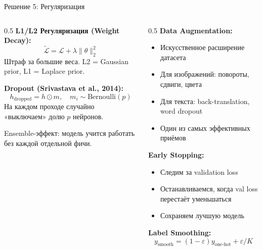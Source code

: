 \documentclass[aspectratio=169, 9pt]{beamer}
\begin{document}
\begin{frame}{Решение 5: Регуляризация}
  \begin{columns}[T]
    \begin{column}{0.5\textwidth}
      \textbf{L1/L2 Регуляризация (Weight Decay):}
      \[
      \tilde{\mathcal{L}} = \mathcal{L} + \lambda \|\theta\|_2^2
      \]
      Штраф за большие веса. L2 = Gaussian prior, L1 = Laplace prior.
      
      \vspace{0.5em}
      \textbf{Dropout (Srivastava et al., 2014):}
      \[
      h_{\text{dropped}} = h \odot m, \quad m_i \sim \text{Bernoulli}(p)
      \]
      На каждом проходе случайно «выключаем» долю $p$ нейронов.
      
      \vspace{0.3em}
      Ensemble-эффект: модель учится работать без каждой отдельной фичи.
    \end{column}
    \begin{column}{0.5\textwidth}
      \textbf{Data Augmentation:}
      \begin{itemize}
        \item Искусственное расширение датасета
        \item Для изображений: повороты, сдвиги, цвета
        \item Для текста: back-translation, word dropout
        \item Один из самых эффективных приёмов
      \end{itemize}
      
      \vspace{0.5em}
      \textbf{Early Stopping:}
      \begin{itemize}
        \item Следим за validation loss
        \item Останавливаемся, когда val loss перестаёт уменьшаться
        \item Сохраняем лучшую модель
      \end{itemize}
      
      \vspace{0.5em}
      \textbf{Label Smoothing:}
      \[
      y_{\text{smooth}} = (1-\varepsilon) y_{\text{one-hot}} + \varepsilon / K
      \]
    \end{column}
  \end{columns}
\end{frame}
\end{document}
